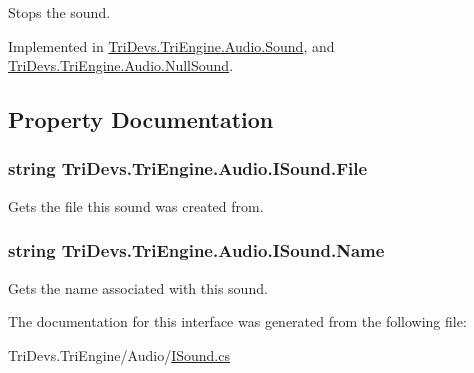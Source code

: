 Stops the sound. 



Implemented in \hyperlink{class_tri_devs_1_1_tri_engine_1_1_audio_1_1_sound_ae1af6639ffcc741fc17b58322b3d955a}{Tri\-Devs.\-Tri\-Engine.\-Audio.\-Sound}, and \hyperlink{class_tri_devs_1_1_tri_engine_1_1_audio_1_1_null_sound_abc5395c18bd298050278547353548b56}{Tri\-Devs.\-Tri\-Engine.\-Audio.\-Null\-Sound}.



\subsection{Property Documentation}
\hypertarget{interface_tri_devs_1_1_tri_engine_1_1_audio_1_1_i_sound_ad2ca796ca0364195acfc2f1d455d8d1e}{
\subsubsection[{File}]{\setlength{\rightskip}{0pt plus 5cm}string Tri\-Devs.\-Tri\-Engine.\-Audio.\-I\-Sound.\-File\hspace{0.3cm}{\ttfamily [get]}}}\label{interface_tri_devs_1_1_tri_engine_1_1_audio_1_1_i_sound_ad2ca796ca0364195acfc2f1d455d8d1e}


Gets the file this sound was created from. 

\hypertarget{interface_tri_devs_1_1_tri_engine_1_1_audio_1_1_i_sound_a92371bfd019441c3766d5e61f126de82}{
\subsubsection[{Name}]{\setlength{\rightskip}{0pt plus 5cm}string Tri\-Devs.\-Tri\-Engine.\-Audio.\-I\-Sound.\-Name\hspace{0.3cm}{\ttfamily [get]}}}\label{interface_tri_devs_1_1_tri_engine_1_1_audio_1_1_i_sound_a92371bfd019441c3766d5e61f126de82}


Gets the name associated with this sound. 



The documentation for this interface was generated from the following file\-:\begin{DoxyCompactItemize}
\item 
Tri\-Devs.\-Tri\-Engine/\-Audio/\hyperlink{_i_sound_8cs}{I\-Sound.\-cs}\end{DoxyCompactItemize}
